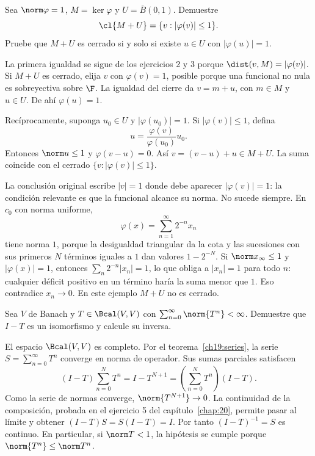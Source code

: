 \begin{ejercicio}
Sea $\norm\varphi=1$, $M=\ker\varphi$ y $U=\overline B(0,1)$. Demuestre
\[
 \cl{M+U}=\{v:|\varphi(v)|\leq1\}.
\]
Pruebe que $M+U$ es cerrado si y solo si existe $u\in U$ con $|\varphi(u)|=1$.
\end{ejercicio}
\begin{solucion}
La primera igualdad se sigue de los ejercicios 2 y 3 porque $\dist(v,M)=|\varphi(v)|$. Si $M+U$ es cerrado, elija $v$ con $\varphi(v)=1$, posible porque una funcional no nula es sobreyectiva sobre $\F$. La igualdad del cierre da $v=m+u$, con $m\in M$ y $u\in U$. De ahí $\varphi(u)=1$.

Recíprocamente, suponga $u_0\in U$ y $|\varphi(u_0)|=1$. Si $|\varphi(v)|\leq1$, defina
\[
 u=\frac{\varphi(v)}{\varphi(u_0)}u_0.
\]
Entonces $\norm u\leq1$ y $\varphi(v-u)=0$. Así $v=(v-u)+u\in M+U$. La suma coincide con el cerrado $\{v:|\varphi(v)|\leq1\}$.

La conclusión original escribe $|v|=1$ donde debe aparecer $|\varphi(v)|=1$: la condición relevante es que la funcional alcance su norma. No sucede siempre. En $c_0$ con norma uniforme,
\[
 \varphi(x)=\sum_{n=1}^{\infty}2^{-n}x_n
\]
tiene norma $1$, porque la desigualdad triangular da la cota y las sucesiones con sus primeros $N$ términos iguales a $1$ dan valores $1-2^{-N}$. Si $\norm x_\infty\leq1$ y $|\varphi(x)|=1$, entonces $\sum_n2^{-n}|x_n|=1$, lo que obliga a $|x_n|=1$ para todo $n$: cualquier déficit positivo en un término haría la suma menor que $1$. Eso contradice $x_n\to0$. En este ejemplo $M+U$ no es cerrado.
\end{solucion}

\begin{ejercicio}
Sea $V$ de Banach y $T\in\Bcal(V,V)$ con $\sum_{n=0}^{\infty}\norm{T^n}<\infty$. Demuestre que $I-T$ es un isomorfismo y calcule su inversa.
\end{ejercicio}
\begin{solucion}
El espacio $\Bcal(V,V)$ es completo. Por el teorema~\ref{ch19:series}, la serie $S=\sum_{n=0}^{\infty}T^n$ converge en norma de operador. Sus sumas parciales satisfacen
\[
 (I-T)\sum_{n=0}^NT^n=I-T^{N+1}
 =\left(\sum_{n=0}^NT^n\right)(I-T).
\]
Como la serie de normas converge, $\norm{T^{N+1}}\to0$. La continuidad de la composición, probada en el ejercicio 5 del capítulo~\ref{chap:20}, permite pasar al límite y obtener $(I-T)S=S(I-T)=I$. Por tanto $(I-T)^{-1}=S$ es continuo. En particular, si $\norm T<1$, la hipótesis se cumple porque $\norm{T^n}\leq\norm T^n$.
\end{solucion}

